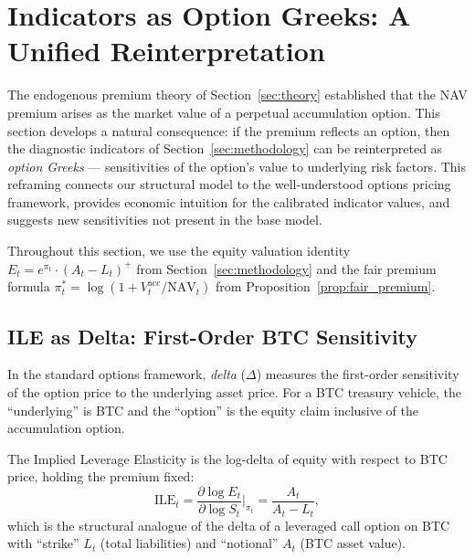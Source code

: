 \section{Indicators as Option Greeks: A Unified Reinterpretation}
\label{sec:greeks}

The endogenous premium theory of Section~\ref{sec:theory} established that the NAV premium arises as the market value of a perpetual accumulation option. This section develops a natural consequence: if the premium reflects an option, then the diagnostic indicators of Section~\ref{sec:methodology} can be reinterpreted as \emph{option Greeks} --- sensitivities of the option's value to underlying risk factors. This reframing connects our structural model to the well-understood options pricing framework, provides economic intuition for the calibrated indicator values, and suggests new sensitivities not present in the base model.

Throughout this section, we use the equity valuation identity $E_t = e^{\pi_t} \cdot (A_t - L_t)^+$ from Section~\ref{sec:methodology} and the fair premium formula $\pi_t^* = \log(1 + V_t^{\mathrm{acc}} / \mathrm{NAV}_t)$ from Proposition~\ref{prop:fair_premium}.

\subsection{ILE as Delta: First-Order BTC Sensitivity}
\label{subsec:ile_delta}

In the standard options framework, \emph{delta} ($\Delta$) measures the first-order sensitivity of the option price to the underlying asset price. For a BTC treasury vehicle, the ``underlying'' is BTC and the ``option'' is the equity claim inclusive of the accumulation option.

\begin{proposition}
\label{prop:ile_delta}
The Implied Leverage Elasticity is the log-delta of equity with respect to BTC price, holding the premium fixed:
\begin{equation}
\label{eq:ile_as_delta}
  \mathrm{ILE}_t = \frac{\partial \log E_t}{\partial \log S_t}\bigg|_{\pi_t} = \frac{A_t}{A_t - L_t},
\end{equation}
which is the structural analogue of the delta of a leveraged call option on BTC with ``strike'' $L_t$ (total liabilities) and ``notional'' $A_t$ (BTC asset value).
\end{proposition}

